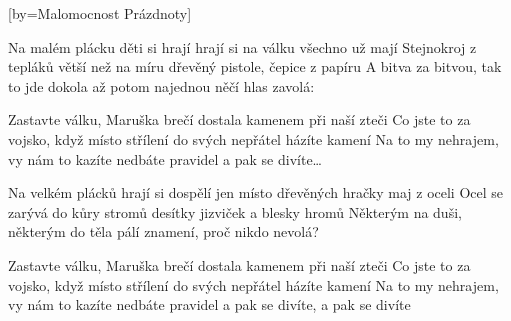[by={Malomocnost Prázdnoty}]

\beginverse{}
Na malém plácku děti si hrají
hrají si na válku všechno už mají
Stejnokroj z tepláků větší než na míru
dřevěný pistole, čepice z papíru
A bitva za bitvou, tak to jde dokola
až potom najednou něčí hlas zavolá:
\endverse{}

\beginchorus{}
Zastavte válku, Maruška brečí
dostala kamenem při naší zteči
Co jste to za vojsko, když místo střílení
do svých nepřátel házíte kamení
Na to my nehrajem, vy nám to kazíte
nedbáte pravidel a pak se divíte\ldots{}
\endchorus{}

\beginverse{}
\chordsoff{}
Na velkém plácků hrají si dospělí
jen místo dřevěných hračky maj z oceli
Ocel se zarývá do kůry stromů
desítky jizviček a blesky hromů
Některým na duši, některým do těla
pálí znamení, proč nikdo nevolá?
\chordson{}
\endverse{}

\beginchorus{}
\chordsoff{}
Zastavte válku, Maruška brečí
dostala kamenem při naší zteči
Co jste to za vojsko, když místo střílení
do svých nepřátel házíte kamení
Na to my nehrajem, vy nám to kazíte
nedbáte pravidel a pak se divíte, a pak se divíte
\chordson{}
\endchorus{}

\endsong{}
